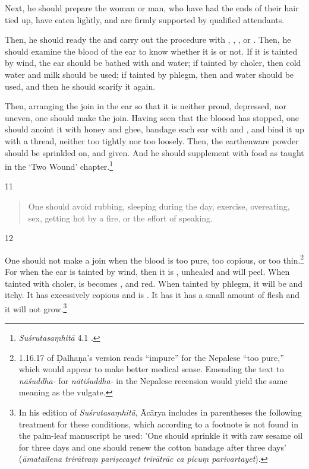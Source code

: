 \begin{translation}
    Next, he should prepare the woman or man, who have had the ends of their hair tied 
    up, have eaten lightly, and are firmly supported by qualified 
    attendants.
    
    Then, he should ready the  and carry out the procedure with
    , , , or
    . Then, he should examine the blood of the ear to know whether it is 
     or not. If it is tainted by wind, the ear should be
    bathed with  and water; if tainted by choler, 
    then cold water
    and milk should be used; if tainted by phlegm, then  and water
    should be used, and then he should scarify it again.
    
    
    Then, arranging the join in the ear so that it is neither proud, depressed, nor
    uneven, one should make the join. Having seen that the bloood has stopped, one should anoint it with honey and ghee,
    bandage each ear with  and , and
    bind it up with a thread, neither too tightly nor too loosely.  Then, the earthenware
    powder should be sprinkled on, and  given.
    And he should supplement with food as taught in  the `Two Wound'
    chapter.\footnote{\emph{Suśrutasaṃhitā} 4.1 \citep[396–408]{vulgate}.}
    
    \item[11]
    \begin{verse}
        One should avoid rubbing, sleeping during the day, exercise, overeating,
        sex, getting hot by a fire, or the effort of speaking.
    \end{verse}
    
    \item[12]
    
    One should not make a join when the blood is too pure, too copious, or too
    thin.\footnote{1.16.17 of Ḍalhaṇa's version \citep[79]{vulgate} reads “impure” for the Nepalese “too pure,” which would
    appear to make better medical sense.  Emending the text to \emph{nāśuddha-} for
    \emph{nātiśuddha-} in the Nepalese recension would yield the same meaning as the
    vulgate.} For when the ear is tainted by wind, then it is
    , unhealed and will peel. When tainted with
    choler, is becomes ,  and red.  When tainted
    by phlegm, it will be  and itchy.  It has excessively copious
     and is .  It has it has a small
    amount of  flesh and it will not grow.\footnote{In his edition of \emph{Suśrutasaṃhitā}, Ācārya \citep[79 n. 1]{vulgate} includes in parentheses the following treatment for these conditions, which according to a footnote is not found in the palm-leaf manuscript he used: 'One should sprinkle it with raw sesame oil for three days and one should renew the cotton bandage after three days' (\emph{āmatailena trirātraṃ pariṣecayet trirātrāc ca picuṃ parivartayet}).}
    

\end{translation}
